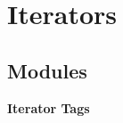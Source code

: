 \section{Iterators}
\label{group__iterators}
\subsection*{Modules}
\begin{CompactItemize}
\item 
{\bf Iterator Tags}
\end{CompactItemize}
